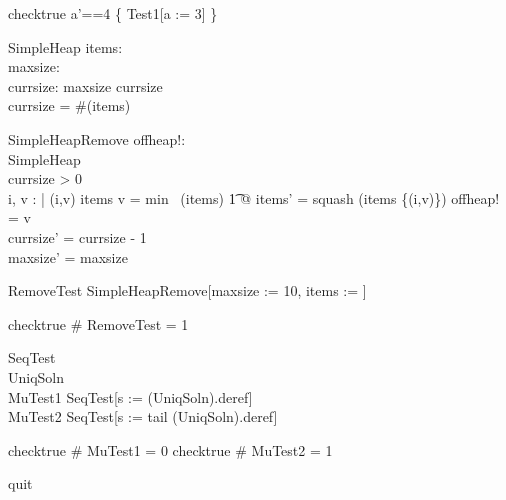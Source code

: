 checktrue \lblot a'==4 \rblot \in \{ Test1[a := 3] \}

\begin{schema}{SimpleHeap}
    items: \seq \nat \\
    maxsize: \nat \\
    currsize: \nat
\where
    maxsize \geq currsize \\
    currsize = \#(\ran items)
\end{schema}

\begin{schema}{SimpleHeapRemove}
    offheap!: \nat \\
    \Delta SimpleHeap \\
\where
    currsize > 0 \\
    \exists i, v : \nat | (i,v) \in items \land v = min~ (\ran items)
    \t1 @ items' = squash (items \setminus \{(i,v)\}) \land offheap! = v\\ 
    currsize' = currsize - 1 \\
    maxsize' = maxsize 
\end{schema}

\begin{zed}
  RemoveTest  SimpleHeapRemove[maxsize := 10, 
                                    items :=  \rangle]
\end{zed}
checktrue \# RemoveTest = 1


\begin{zed}
  SeqTest   \\
  UniqSoln  \\
  MuTest1   SeqTest[s := (\mu UniqSoln).deref] \\
  MuTest2   SeqTest[s := tail (\mu UniqSoln).deref]
\end{zed}

checktrue \# MuTest1 = 0
checktrue \# MuTest2 = 1

quit
